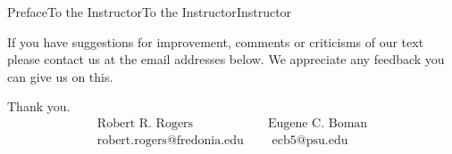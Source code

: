 \documentclass[oneside,10pt,]{book}
\numberwithin{equation}{part}
\newcommand{\amp}{&}
\begin{document}
\begin{preface}{Preface}{To the Instructor}{}{To the Instructor}{}{}{Instructor}
\par
If you have suggestions for improvement, comments or criticisms of our text please contact us at the email addresses below.  We appreciate any feedback you can give us on this.%
\par
Thank you.%
\begin{equation*}
\begin{array}{lcl} \text{ Robert R. Rogers } \amp \amp \text{
Eugene C. Boman } \\ \text{ robert.rogers@fredonia.edu } \amp
\amp \text{ ecb5@psu.edu } \end{array}
\end{equation*}
%
\end{preface}
\setcounter{tocdepth}{0}
\renewcommand*\contentsname{Contents}
\tableofcontents
\mainmatter
%
%
\typeout{************************************************}
\typeout{************************************************}
%
\end{document}
